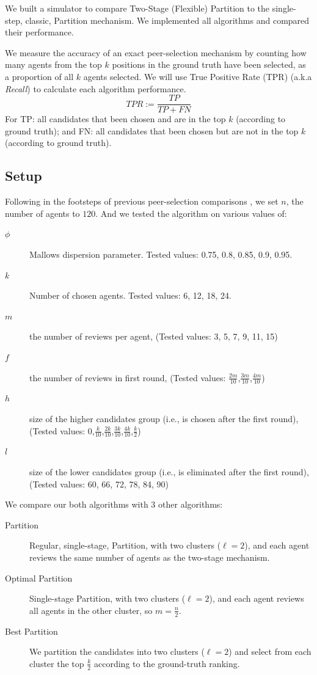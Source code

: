 \documentclass[letterpaper]{article} %
\begin{document}
We built a simulator to compare Two-Stage (Flexible) Partition to the single-step, classic, Partition mechanism. We implemented all algorithms and compared their performance.

We measure the accuracy of an exact peer-selection mechanism by counting how many agents from the top $k$ positions in the ground truth have been selected, as a proportion of all $k$ agents selected. We will use True Positive Rate (TPR) (a.k.a \emph{Recall}) to calculate each algorithm performance.
\small
$$
TPR := \frac{TP}{TP + FN}
$$
\normalsize
For TP: all candidates that been chosen and are in the top $k$ (according to ground truth); and
FN: all candidates that been chosen but are not in the top $k$ (according to ground truth).

\subsection{Setup}
Following in the footsteps of previous peer-selection comparisons \cite{ALMRW19,LMTZ23}, we set $n$, the number of agents to $120$. And we tested the algorithm on various values of:
\begin{description}
\item [$\phi$] Mallows dispersion parameter. Tested values: 0.75, 0.8, 0.85, 0.9, 0.95.
\item [$k$] Number of chosen agents. Tested values: 6, 12, 18, 24.
\item [$m$] the number of reviews per agent, (Tested values: 3, 5, 7, 9, 11, 15)
\item [$f$] the number of reviews in first round, (Tested values: $\frac{2m}{10}$,$\frac{3m}{10}$,$\frac{4m}{10}$)
\item [$h$] size of the higher candidates group (i.e., is chosen after the first round), (Tested values: $0$,$\frac{k}{10}$,$\frac{2k}{10}$,$\frac{3k}{10}$,$\frac{4k}{10}$,$\frac{k}{2}$)
\item [$l$] size of the lower candidates group (i.e., is eliminated after the first round), (Tested values: 60, 66, 72, 78, 84, 90)
\end{description}
We compare our both algorithms with 3 other algorithms:
\begin{description}
\item [Partition] Regular, single-stage, Partition, with two clusters ($\ell=2$), and each agent reviews the same number of agents as the two-stage mechanism.
\item [Optimal Partition] Single-stage Partition, with two clusters ($\ell=2$), and each agent reviews all agents in the other cluster, so $m=\frac{n}{2}$.
\item [Best Partition] We partition the candidates into two clusters ($\ell=2$) and select from each cluster the top $\frac{k}{2}$ according to the ground-truth ranking.
\end{description}
\end{document}
